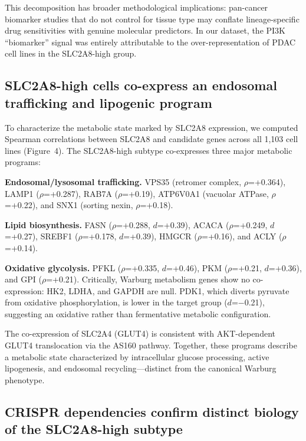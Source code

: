 \documentclass[12pt]{article}
\begin{document}
This decomposition has broader methodological implications: pan-cancer
biomarker studies that do not control for tissue type may conflate
lineage-specific drug sensitivities with genuine molecular predictors.
In our dataset, the PI3K ``biomarker'' signal was entirely attributable
to the over-representation of PDAC cell lines in the SLC2A8-high group.

\subsection{SLC2A8-high cells co-express an endosomal trafficking and
lipogenic program}

To characterize the metabolic state marked by SLC2A8 expression, we
computed Spearman correlations between SLC2A8 and candidate genes across
all 1,103 cell lines (Figure~4). The SLC2A8-high subtype co-expresses
three major metabolic programs:

\textbf{Endosomal/lysosomal trafficking.} VPS35 (retromer complex,
$\rho$=+0.364), LAMP1 ($\rho$=+0.287), RAB7A ($\rho$=+0.19), ATP6V0A1
(vacuolar ATPase, $\rho$=+0.22), and SNX1 (sorting nexin,
$\rho$=+0.18).

\textbf{Lipid biosynthesis.} FASN ($\rho$=+0.288, $d$=+0.39), ACACA
($\rho$=+0.249, $d$=+0.27), SREBF1 ($\rho$=+0.178, $d$=+0.39), HMGCR
($\rho$=+0.16), and ACLY ($\rho$=+0.14).

\textbf{Oxidative glycolysis.} PFKL ($\rho$=+0.335, $d$=+0.46), PKM
($\rho$=+0.21, $d$=+0.36), and GPI ($\rho$=+0.21). Critically, Warburg
metabolism genes show no co-expression: HK2, LDHA, and GAPDH are null.
PDK1, which diverts pyruvate from oxidative phosphorylation, is lower
in the target group ($d$=$-$0.21), suggesting an oxidative rather than
fermentative metabolic configuration.

The co-expression of SLC2A4 (GLUT4) is consistent with AKT-dependent
GLUT4 translocation via the AS160 pathway. Together, these programs
describe a metabolic state characterized by intracellular glucose
processing, active lipogenesis, and endosomal recycling---distinct from
the canonical Warburg phenotype.

\subsection{CRISPR dependencies confirm distinct biology of the
SLC2A8-high subtype}
\end{document}
